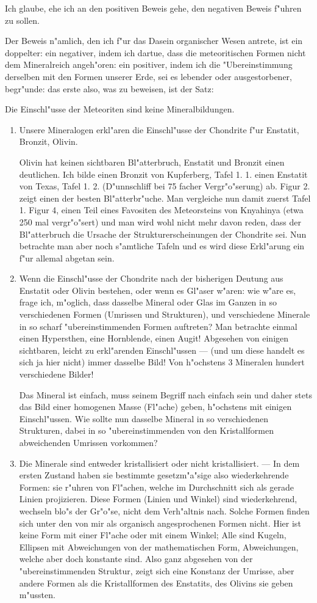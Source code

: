 \documentclass[a4paper, 11pt, oneside]{article}
\begin{document}
Ich glaube, ehe ich an den positiven Beweis gehe, den negativen Beweis f"uhren zu sollen.

Der Beweis n"amlich, den ich f"ur das Dasein organischer Wesen antrete, ist ein doppelter: ein negativer, indem ich dartue, dass die meteoritischen Formen nicht dem Mineralreich angeh"oren: ein positiver, indem ich die "Ubereinstimmung derselben mit den Formen unserer Erde, sei es lebender oder ausgestorbener, begr"unde: das erste also, was zu beweisen, ist der Satz:

Die Einschl"usse der Meteoriten sind keine Mineralbildungen.
\begin{enumerate}
\item Unsere Mineralogen erkl"aren die Einschl"usse der Chondrite f"ur Enstatit, Bronzit, Olivin.

Olivin hat keinen sichtbaren Bl"atterbruch, Enstatit und Bronzit einen deutlichen. Ich bilde einen Bronzit von Kupferberg, Tafel 1. 1. einen Enstatit von Texas, Tafel 1. 2. (D"unnschliff bei 75 facher Vergr"o"serung) ab. Figur 2. zeigt einen der besten Bl"atterbr"uche. Man vergleiche nun damit zuerst Tafel 1. Figur 4, einen Teil eines Favositen des Meteorsteins von Knyahinya (etwa 250 mal vergr"o"sert) und man wird wohl nicht mehr davon reden, dass der Bl"atterbruch die Ursache der Strukturerscheinungen der Chondrite sei. Nun betrachte man aber noch s"amtliche Tafeln und es wird diese Erkl"arung ein f"ur allemal abgetan sein.
\item Wenn die Einschl"usse der Chondrite nach der bisherigen Deutung aus Enstatit oder Olivin bestehen, oder wenn es Gl"aser w"aren: wie w"are es, frage ich, m"oglich, dass dasselbe Mineral oder Glas im Ganzen in so verschiedenen Formen (Umrissen und Strukturen), und verschiedene Minerale in so scharf "ubereinstimmenden Formen auftreten? Man betrachte einmal einen Hypersthen, eine Hornblende, einen Augit! Abgesehen von einigen sichtbaren, leicht zu erkl"arenden Einschl"ussen --- (und um diese handelt es sich ja hier nicht) immer dasselbe Bild! Von h"ochstens 3 Mineralen hundert verschiedene Bilder!

Das Mineral ist einfach, muss seinem Begriff nach einfach sein und daher stets das Bild einer homogenen Masse (Fl"ache) geben, h"ochstens mit einigen Einschl"ussen. Wie sollte nun dasselbe Mineral in so verschiedenen Strukturen, dabei in so "ubereinstimmenden von den Kristallformen abweichenden Umrissen vorkommen?
\item Die Minerale sind entweder kristallisiert oder nicht kristallisiert. --- In dem ersten Zustand haben sie bestimmte gesetzm"a"sige also wiederkehrende Formen: sie r"uhren von Fl"achen, welche im Durchschnitt sich als gerade Linien projizieren. Diese Formen (Linien und Winkel) sind wiederkehrend, wechseln blo"s der Gr"o"se, nicht dem Verh"altnis nach. Solche Formen finden sich unter den von mir als organisch angesprochenen Formen nicht. Hier ist keine Form mit einer Fl"ache oder mit einem Winkel; Alle sind Kugeln, Ellipsen mit Abweichungen von der mathematischen Form, Abweichungen, welche aber doch konstante sind. Also ganz abgesehen von der "ubereinstimmenden Struktur, zeigt sich eine Konstanz der Umrisse, aber andere Formen als die Kristallformen des Enstatits, des Olivins sie geben m"ussten.


\end{enumerate}
\end{document}
